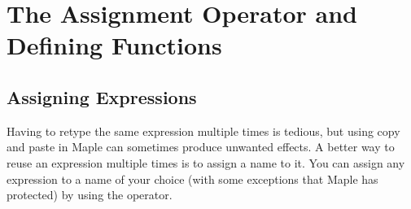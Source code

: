 \chapter{The Assignment Operator and Defining Functions}
\label{chp:assignment_operator}

\section{Assigning Expressions}

Having to retype the same expression multiple times is tedious, but using copy and paste in Maple can sometimes produce unwanted effects. A better way to reuse an expression multiple times is to assign a name to it. You can assign any expression to a name of your choice (with some exceptions that Maple has protected) by using the \text{:=} operator.

\begin{maplegroup}
\begin{mapleinput}
\end{mapleinput}
\mapleresult
\begin{maplelatex}
\end{maplelatex}
\end{maplegroup}

\begin{maplegroup}
\begin{mapleinput}
\end{mapleinput}
\mapleresult
\begin{maplelatex}
\end{maplelatex}
\end{maplegroup}

\begin{maplegroup}
\begin{mapleinput}
\end{mapleinput}
\mapleresult
\begin{maplelatex}
\end{maplelatex}
\end{maplegroup}

